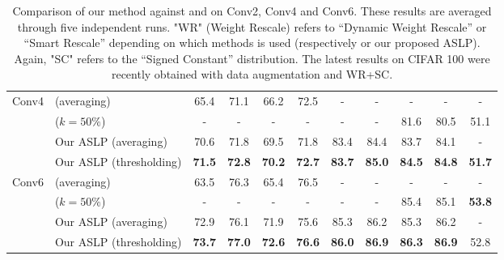 \begin{table*}[htbp]
{\begin{tabular}{@{}llcccccccc|c@{}}
    \multirow{4}{*}{Conv4} & \cite{DBLP:conf/nips/ZhouLLY19} (averaging)       & 65.4          & 71.1          & 66.2          & 72.5          & -             & -             & -             & -             &             -           \\
                            & \cite{DBLP:conf/cvpr/RamanujanWKFR20}\footnotemark[\value{footnote}] ($k=50\%$) &        -      &  -            &            -  &  -            &  -            &  -            & 81.6  &     80.5    &  51.1  \\ 
                            & Our ASLP (averaging)                                          & 70.6          & 71.8          & 69.5          & 71.8          & 83.4          & 84.4          & 83.7          & 84.1          &        -   \\
                            & Our ASLP (thresholding)                                      & \textbf{71.5}  & \textbf{72.8}& \textbf{70.2} & \textbf{72.7} & \textbf{83.7}& \textbf{85.0} & \textbf{84.5} & \textbf{84.8} &         \textbf{51.7}  \\
                            \midrule
    \multirow{4}{*}{Conv6} & \cite{DBLP:conf/nips/ZhouLLY19} (averaging)    & 63.5          & 76.3          & 65.4          & 76.5          & -             & -             & -             & -      &  -       \\
                            & \cite{DBLP:conf/cvpr/RamanujanWKFR20}\footnotemark[\value{footnote}] ($k=50\%$) &      -        &    -          &        -      &     -         &      -        &           -   &  85.4 &    85.1   &   \textbf{53.8}   \\ 
                            & Our ASLP (averaging)                                      & 72.9          & 76.1          & 71.9          & 75.6          & 85.3          & 86.2          & 85.3          & 86.2          &  - \\
                            & Our ASLP (thresholding)                                       & \textbf{73.7} &\textbf{77.0}  &\textbf{72.6}  &\textbf{76.6}  &\textbf{86.0}  &\textbf{86.9}  & \textbf{86.3} &\textbf{86.9}  &   52.8 \\
                            \bottomrule
    \end{tabular}
}

  \caption{\footnotesize Comparison of our method against \cite{DBLP:conf/nips/ZhouLLY19}
  and \cite{DBLP:conf/cvpr/RamanujanWKFR20} on Conv2, Conv4 and Conv6. These
  results are averaged through five independent runs. "WR" (Weight Rescale)
  refers to ``Dynamic Weight Rescale'' or ``Smart Rescale'' depending on which
  methods is used (respectively \cite{DBLP:conf/nips/ZhouLLY19} or our proposed
  ASLP). Again, "SC" refers to the ``Signed Constant'' distribution. The latest results on CIFAR 100
  were recently obtained with data augmentation and WR+SC.}
  \label{tbl:conv_compare}

\end{table*}

